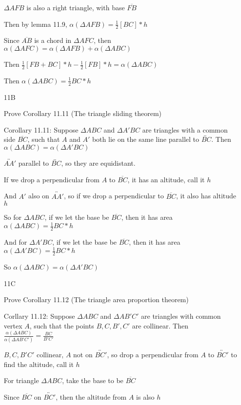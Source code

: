 \documentclass[11pt]{article}
\newcommand{\lines}[1]{\overleftrightarrow{#1}}
\newcommand{\segment}[1]{\overline{#1}}
\begin{document}
\begin{itemize}
		$\Delta AFB$ is also a right triangle, with base $\segment{FB}$

		Then by lemma 11.9, $\alpha(\Delta AFB) = \frac{1}{2}[BC]*h$

		Since $\segment{AB}$ is a chord in $\Delta AFC$, then $\alpha(\Delta AFC) = \alpha(\Delta AFB) + \alpha(\Delta ABC)$

		Then $\frac{1}{2}[FB + BC]*h - \frac{1}{2}[FB]*h = \alpha(\Delta ABC)$

		Then $\alpha(\Delta ABC) = \frac{1}{2}BC*h$
	\item[11B]

		Prove Corollary 11.11 (The triangle sliding theorem)

		Corollary 11.11: Suppose $\Delta ABC$ and $\Delta A'BC$ are triangles with a common side $\segment{BC}$, such that $A$ and $A'$ both lie on the same line parallel to $\lines{BC}$. Then $\alpha(\Delta ABC) = \alpha(\Delta A'BC)$

		$\lines{AA'}$ parallel to $\lines{BC}$, so they are equidistant.

		If we drop a perpendicular from $A$ to $\segment{BC}$, it has an altitude, call it $h$

		And $A'$ also on $\lines{AA'}$, so if we drop a perpendicular to $\segment{BC}$, it also has altitude $h$

		So for $\Delta ABC$, if we let the base be $\segment{BC}$, then it has area $\alpha(\Delta ABC) = \frac{1}{2} BC*h$

		And for $\Delta A'BC$, if we let the base be $\segment{BC}$, then it has area $\alpha(\Delta A'BC) = \frac{1}{2} BC*h$

		So $\alpha(\Delta ABC) = \alpha(\Delta A'BC)$
	\item[11C]

		Prove Corollary 11.12 (The triangle area proportion theorem)

		Corllary 11.12: Suppose $\Delta ABC$ and $\Delta AB'C'$ are triangles with common vertex $A$, such that the points $B,C,B',C'$ are collinear. Then $\frac{\alpha(\Delta ABC)}{\alpha(\Delta AB'C')} = \frac{BC}{B'C'}$

		$B,C,B'C'$ collinear, $A$ not on $\lines{BC'}$, so drop a perpendicular from $A$ to $\lines{BC'}$ to find the altitude, call it $h$

		For triangle $\Delta ABC$, take the base to be $\segment{BC}$

		Since $\segment{BC}$ on $\lines{BC'}$, then the altitude from $A$ is also $h$


\end{itemize}
\end{document}
